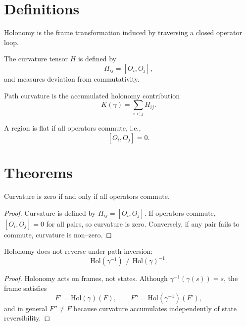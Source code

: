 \section{Definitions}

\begin{definition}[Holonomy]
Holonomy is the frame transformation induced by traversing a closed
operator loop.
\end{definition}

\begin{definition}
The curvature tensor $H$ is defined by
\[
H_{ij} = [O_i, O_j],
\]
and measures deviation from commutativity.
\end{definition}

\begin{definition}
Path curvature is the accumulated holonomy contribution
\[
K(\gamma) = \sum_{i < j} H_{ij}.
\]
\end{definition}

\begin{definition}
A region is flat if all operators commute, i.e.,
\[
[O_i, O_j] = 0.
\]
\end{definition}

\section{Theorems}

\begin{theorem}
Curvature is zero if and only if all operators commute.
\end{theorem}

\begin{proof}
Curvature is defined by $H_{ij} = [O_i, O_j]$. If operators commute,
$[O_i, O_j] = 0$ for all pairs, so curvature is zero. Conversely, if any
pair fails to commute, curvature is non–zero.
\end{proof}

\begin{theorem}
Holonomy does not reverse under path inversion:
\[
\mathrm{Hol}(\gamma^{-1}) \neq \mathrm{Hol}(\gamma)^{-1}.
\]
\end{theorem}

\begin{proof}
Holonomy acts on frames, not states. Although
$\gamma^{-1}(\gamma(s)) = s$, the frame satisfies
\[
F' = \mathrm{Hol}(\gamma)(F),
\qquad
F'' = \mathrm{Hol}(\gamma^{-1})(F'),
\]
and in general $F'' \neq F$ because curvature accumulates independently
of state reversibility.
\end{proof}

